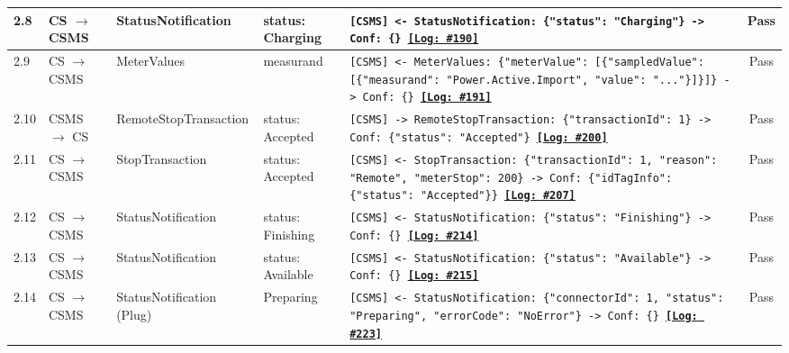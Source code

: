 \documentclass[10pt, a4paper, landscape]{article}
\begin{document}
\begin{longtable}{|p{1.0cm}|p{2.5cm}|p{4.0cm}|p{5.0cm}|p{10.0cm}|c|}
\hline
2.8 & CS $\to$ CSMS & StatusNotification & status: Charging & \footnotesize\texttt{[CSMS] <- StatusNotification: \{"status": "Charging"\} \newline [CSMS] -> Conf: \{\} \newline \hyperref[log:2.8]{\textbf{[Log: \#190]}}} & Pass \\
\hline
2.9 & CS $\to$ CSMS & MeterValues & measurand & \footnotesize\texttt{[CSMS] <- MeterValues: \{"meterValue": [\{"sampledValue": [\{"measurand": "Power.Active.Import", "value": "..."\}]\}]\} \newline [CSMS] -> Conf: \{\} \newline \hyperref[log:2.9]{\textbf{[Log: \#191]}}} & Pass \\
\hline
2.10 & CSMS $\to$ CS & RemoteStopTransaction & status: Accepted & \footnotesize\texttt{[CSMS] -> RemoteStopTransaction: \{"transactionId": 1\} \newline [CS] -> Conf: \{"status": "Accepted"\} \newline \hyperref[log:2.10]{\textbf{[Log: \#200]}}} & Pass \\
\hline
2.11 & CS $\to$ CSMS & StopTransaction & status: Accepted & \footnotesize\texttt{[CSMS] <- StopTransaction: \{"transactionId": 1, "reason": "Remote", "meterStop": 200\} \newline [CSMS] -> Conf: \{"idTagInfo": \{"status": "Accepted"\}\} \newline \hyperref[log:2.11]{\textbf{[Log: \#207]}}} & Pass \\
\hline
2.12 & CS $\to$ CSMS & StatusNotification & status: Finishing & \footnotesize\texttt{[CSMS] <- StatusNotification: \{"status": "Finishing"\} \newline [CSMS] -> Conf: \{\} \newline \hyperref[log:2.12]{\textbf{[Log: \#214]}}} & Pass \\
\hline
2.13 & CS $\to$ CSMS & StatusNotification & status: Available & \footnotesize\texttt{[CSMS] <- StatusNotification: \{"status": "Available"\} \newline [CSMS] -> Conf: \{\} \newline \hyperref[log:2.13]{\textbf{[Log: \#215]}}} & Pass \\
\hline
2.14 & CS $\to$ CSMS & StatusNotification (Plug) & Preparing & \footnotesize\texttt{[CSMS] <- StatusNotification: \{"connectorId": 1, "status": "Preparing", "errorCode": "NoError"\} \newline [CSMS] -> Conf: \{\} \newline \hyperref[log:2.14]{\textbf{[Log: \#223]}}} & Pass \\

\end{longtable}
\end{document}
